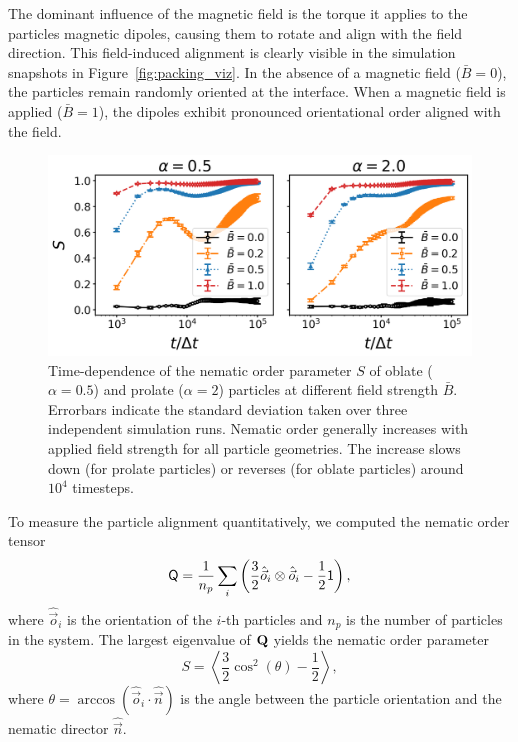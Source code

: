 The dominant influence of the magnetic field is the torque it applies to the particles magnetic dipoles, causing them to rotate and align with the 
field direction. This field-induced alignment is clearly visible in the simulation snapshots in Figure~\ref{fig:packing_viz}. In the absence of a 
magnetic field (\(\bar{B} = 0\)), the particles remain randomly oriented at the interface. When a magnetic field is applied (\(\bar{B} = 1\)), the 
dipoles exhibit pronounced orientational order aligned with the field. 

    
    \begin{figure}
    \centering
    \includegraphics[scale=0.6]{../figures/results/paper1/S-vs-t.png}
    \caption{Time-dependence of the nematic order parameter $S$ of oblate ($\alpha=0.5$) and prolate ($\alpha=2$) particles at different field strength $\bar{B}$. Errorbars indicate the standard deviation taken over three independent simulation runs. Nematic order generally increases with applied field strength for all particle geometries. The increase slows down (for prolate particles) or reverses (for oblate particles) around $10^4$ timesteps.}
    \label{fig:nematic_time}
    \end{figure}
    
    To measure the particle alignment quantitatively, we computed the
    nematic order tensor \cite{veerman_phase_1992}
    \begin{equation}
    \tens{Q} = \frac{1}{n_p} \sum_i \left( \frac{3}{2} \hat{\vec{o}}_i \otimes \hat{\vec{o}}_i -\frac{1}{2}\mathsf{1} \right) ,
    \end{equation}
    where \(\hat{\vec{o}}_i\) is the orientation of the
    \(i\)-th particles and \(n_p\) is the number of particles in the system.
    The largest eigenvalue of \(\tens{Q}\) yields the nematic order
    parameter
    \begin{equation}
    S = \left\langle \frac{3}{2}\cos^2 (\theta) - \frac{1}{2} \right\rangle ,
    \end{equation}
    where
    \(\theta=\arccos(\hat{\vec{o}}_i\cdot\hat{\vec{n}})\) is the angle
    between the particle orientation and the nematic director
    \(\hat{\vec{n}}\).
    
